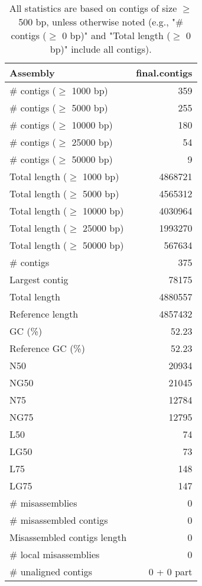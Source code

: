\documentclass[12pt,a4paper]{article}
\begin{document}
\begin{table}[ht]
\begin{center}
\caption{All statistics are based on contigs of size $\geq$ 500 bp, unless otherwise noted (e.g., "\# contigs ($\geq$ 0 bp)" and "Total length ($\geq$ 0 bp)" include all contigs).}
\begin{tabular}{|l*{1}{|r}|}
\hline
Assembly & final.contigs \\ \hline
\# contigs ($\geq$ 1000 bp) & 359 \\ \hline
\# contigs ($\geq$ 5000 bp) & 255 \\ \hline
\# contigs ($\geq$ 10000 bp) & 180 \\ \hline
\# contigs ($\geq$ 25000 bp) & 54 \\ \hline
\# contigs ($\geq$ 50000 bp) & 9 \\ \hline
Total length ($\geq$ 1000 bp) & 4868721 \\ \hline
Total length ($\geq$ 5000 bp) & 4565312 \\ \hline
Total length ($\geq$ 10000 bp) & 4030964 \\ \hline
Total length ($\geq$ 25000 bp) & 1993270 \\ \hline
Total length ($\geq$ 50000 bp) & 567634 \\ \hline
\# contigs & 375 \\ \hline
Largest contig & 78175 \\ \hline
Total length & 4880557 \\ \hline
Reference length & 4857432 \\ \hline
GC (\%) & 52.23 \\ \hline
Reference GC (\%) & 52.23 \\ \hline
N50 & 20934 \\ \hline
NG50 & 21045 \\ \hline
N75 & 12784 \\ \hline
NG75 & 12795 \\ \hline
L50 & 74 \\ \hline
LG50 & 73 \\ \hline
L75 & 148 \\ \hline
LG75 & 147 \\ \hline
\# misassemblies & 0 \\ \hline
\# misassembled contigs & 0 \\ \hline
Misassembled contigs length & 0 \\ \hline
\# local misassemblies & 0 \\ \hline
\# unaligned contigs & 0 + 0 part \\ \hline

\end{tabular}
\end{center}
\end{table}
\end{document}
